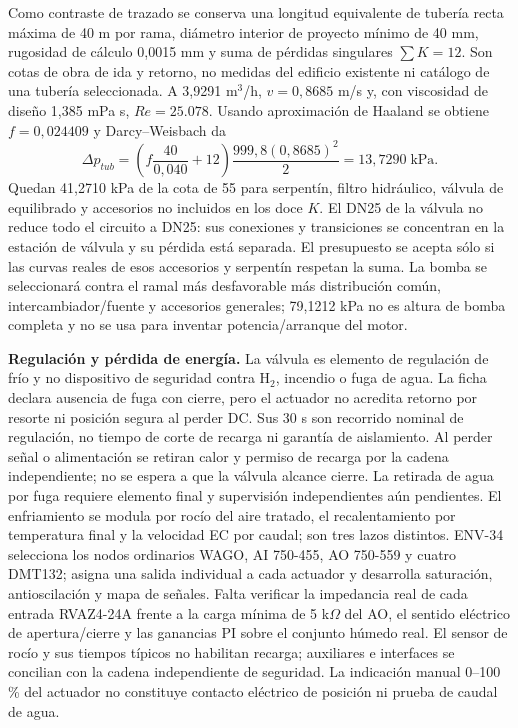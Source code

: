 Como contraste de trazado se conserva una longitud equivalente de tubería recta máxima de 40 m por rama, diámetro interior de proyecto mínimo de 40 mm, rugosidad de cálculo 0,0015 mm y suma de pérdidas singulares $\sum K=12$. Son cotas de obra de ida y retorno, no medidas del edificio existente ni catálogo de una tubería seleccionada. A 3,9291 m$^3$/h, $v=0,8685$ m/s y, con viscosidad de diseño 1,385 mPa s, $Re=25.078$. Usando aproximación de Haaland se obtiene $f=0,024409$ y Darcy--Weisbach da
\[
\Delta p_{tub}=\left(f\frac{40}{0,040}+12\right)\frac{999,8(0,8685)^2}{2}=13,7290\;\mathrm{kPa}.
\]
Quedan 41,2710 kPa de la cota de 55 para serpentín, filtro hidráulico, válvula de equilibrado y accesorios no incluidos en los doce $K$. El DN25 de la válvula no reduce todo el circuito a DN25: sus conexiones y transiciones se concentran en la estación de válvula y su pérdida está separada. El presupuesto se acepta sólo si las curvas reales de esos accesorios y serpentín respetan la suma. La bomba se seleccionará contra el ramal más desfavorable más distribución común, intercambiador/fuente y accesorios generales; 79,1212 kPa no es altura de bomba completa y no se usa para inventar potencia/arranque del motor.

\textbf{Regulación y pérdida de energía.} La válvula es elemento de regulación de frío y no dispositivo de seguridad contra H$_2$, incendio o fuga de agua. La ficha declara ausencia de fuga con cierre, pero el actuador no acredita retorno por resorte ni posición segura al perder DC. Sus 30 s son recorrido nominal de regulación, no tiempo de corte de recarga ni garantía de aislamiento. Al perder señal o alimentación se retiran calor y permiso de recarga por la cadena independiente; no se espera a que la válvula alcance cierre. La retirada de agua por fuga requiere elemento final y supervisión independientes aún pendientes. El enfriamiento se modula por rocío del aire tratado, el recalentamiento por temperatura final y la velocidad EC por caudal; son tres lazos distintos. ENV-34 selecciona los nodos ordinarios WAGO, AI 750-455, AO 750-559 y cuatro DMT132; asigna una salida individual a cada actuador y desarrolla saturación, antioscilación y mapa de señales. Falta verificar la impedancia real de cada entrada RVAZ4-24A frente a la carga mínima de 5 k$\Omega$ del AO, el sentido eléctrico de apertura/cierre y las ganancias PI sobre el conjunto húmedo real. El sensor de rocío y sus tiempos típicos no habilitan recarga; auxiliares e interfaces se concilian con la cadena independiente de seguridad. La indicación manual 0--100\,\% del actuador no constituye contacto eléctrico de posición ni prueba de caudal de agua.

